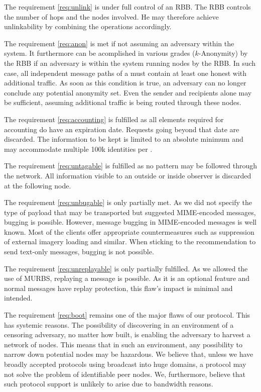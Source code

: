 The requirement \ref{req:unlink} is under full control of an RBB. The RBB controls the number of hops and the nodes involved. He may therefore achieve unlinkability by combining the operations accordingly.

The requirement \ref{req:anon} is met if not assuming an adversary within the system. It furthermore can be acomplished in various grades ($k$-Anonymity) by the RBB if an adversary is within the system running nodes by the RBB. In such case, all independent message paths of a \VortexMessage{} must contain at least one honest \VortexNode{} with additional traffic. As soon as this condition is true, an adversary can no longer conclude any potential anonymity set. Even the sender and recipients alone may be sufficient, assuming additional traffic is being routed through these nodes.

The requirement \ref{req:accounting} is fulfilled as all elements required for accounting do have an expiration date. Requests going beyond that date are discarded. The information to be kept is limited to an absolute minimum and may accommodate multiple 100k identities per \VortexNode.

The requirement \ref{req:untagable} is fulfilled as no pattern may be followed through the network. All information visible to an outside or inside observer is discarded at the following node.

The requirement \ref{req:unbugable} is only partially met. As we did not specify the type of payload that may be transported but suggested MIME-encoded messages, bugging is possible. However, message bugging in MIME-encoded messages is well known. Most of the clients offer appropriate countermeasures such as suppression of external imagery loading and similar. When sticking to the recommendation to send text-only messages, bugging is not possible.

The requirement \ref{req:unreplayable} is only partially fulfilled. As we allowed the use of MURBS, replaying a message is possible. As it is an optional feature and normal messages have replay protection, this flaw's impact is minimal and intended.

The requirement \ref{req:boot} remains one of the major flaws of our protocol. This has systemic reasons. The possibility of discovering \VortexNodes{} in an environment of a censoring adversary, no matter how built, is enabling the adversary to harvest a network of nodes. This means that in such an environment, any possibility to narrow down potential nodes may be hazardous. We believe that, unless we have broadly accepted protocols using broadcast into huge domains, a protocol may not solve the problem of identifiable peer nodes. We, furthermore, believe that such protocol support is unlikely to arise due to bandwidth reasons. 

